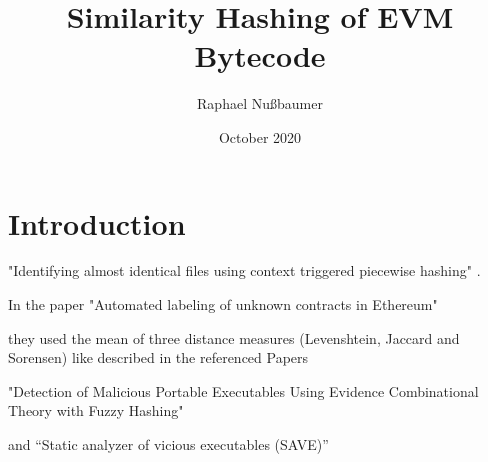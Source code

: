 \documentclass{article}
\title{Similarity Hashing of EVM Bytecode}
\author{Raphael Nußbaumer}
\date{October 2020}
\begin{document}
\maketitle

\section{Introduction}
"Identifying almost identical files using context triggered piecewise hashing" \cite{kornblum2006identifying}.

In the paper "Automated labeling of unknown contracts in Ethereum" \cite{norvill2017automated}

they used the mean of three distance measures (Levenshtein, Jaccard and Sorensen) like described in the referenced Papers

"Detection of Malicious Portable Executables Using Evidence Combinational Theory with Fuzzy Hashing" \cite{namanya2016detection}

and “Static analyzer of vicious executables (SAVE)” \cite{sung2004static}

\printbibliography
\end{document}
